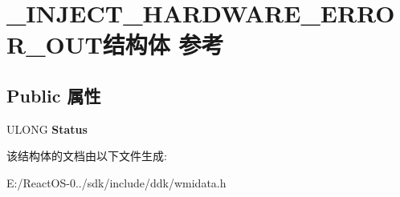 \hypertarget{struct___i_n_j_e_c_t___h_a_r_d_w_a_r_e___e_r_r_o_r___o_u_t}{}\section{\+\_\+\+I\+N\+J\+E\+C\+T\+\_\+\+H\+A\+R\+D\+W\+A\+R\+E\+\_\+\+E\+R\+R\+O\+R\+\_\+\+O\+U\+T结构体 参考}
\label{struct___i_n_j_e_c_t___h_a_r_d_w_a_r_e___e_r_r_o_r___o_u_t}
\subsection*{Public 属性}
\begin{DoxyCompactItemize}
\item 
\mbox{\label{struct___i_n_j_e_c_t___h_a_r_d_w_a_r_e___e_r_r_o_r___o_u_t_ac62644c7eb57b2a50531743c47442d84}} 
U\+L\+O\+NG {\bfseries Status}
\end{DoxyCompactItemize}


该结构体的文档由以下文件生成\+:\begin{DoxyCompactItemize}
\item 
E\+:/\+React\+O\+S-\/0../sdk/include/ddk/wmidata.\+h\end{DoxyCompactItemize}
